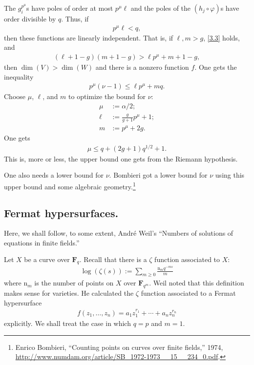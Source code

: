 \documentclass [11 pt, oneside] {article}
\begin{document}
The $g_{i}^{p^{\mu}}$s have poles of order at most $p^{\mu}\ell$ and the poles of the $(h_{j}\circ \varphi)$s have order divisible by $q$. Thus, if
\begin{align}\label{3.3}
	p^{\mu}\ell < q,
\end{align}
then these functions are linearly independent. That is, if $\ell,m >g$, \cref{3.3} holds, and 
\begin{align*}
	 (\ell+1-g) (m+1-g) > \ell p^{\mu} + m+1-g,
\end{align*}
then $\dim(V) > \dim (W)$ and there is a nonzero function $f$. 
One gets the inequality
\begin{align*}
	p^{\mu}(\nu -1) \le \ell p^{\mu}+ mq.
\end{align*}
Choose $\mu$, $\ell$, and $m$ to optimize the bound for $\nu$:
\begin{align*}
	\mu &:= \alpha/2;\\
	\ell &:= \frac{g}{g+1}p^{\mu} + 1;\\
	m &:= p^{\mu}+2g.
\end{align*}
One gets
\begin{align*}
	\mu \le q + (2g+1) q^{1/2} + 1.
\end{align*}
This is, more or less, the upper bound one gets from the Riemann hypothesis.

One also needs a lower bound for $\nu$. Bombieri got a lower bound for $\nu$ using this upper bound and some algebraic geometry.\footnote{Enrico Bombieri, ``Counting points on curves over finite fields,'' 1974, \url{http://www.numdam.org/article/SB_1972-1973__15__234_0.pdf}.}

\subsection{Fermat hypersurfaces.}
Here, we shall follow, to some extent, Andr\'e Weil's ``Numbers of solutions of equations in finite fields.''

Let $X$ be a curve over $\mathbf{F}_{q}$. Recall that there is a $\zeta$ function associated to $X$:
\begin{align*}
	\log(\zeta(s)) := \sum_{m\ge 0}^{}\frac{\mathup{n}_{m}q^{-ms}}{m}
\end{align*}
where $\mathup{n}_{m}$ is the number of points on $X$ over $\mathbf{F}_{q^{m}}$.
Weil noted that this definition makes sense for varieties.
He calculated the $\zeta$ function associated to a Fermat hypersurface
\begin{align*}
	f(z_1,\hdots, z_{n}) = a_1z_1^{r_1} + \cdots + a_{n}z_{n}^{r_{n}}
\end{align*}
explicitly.
We shall treat the case in which $q=p$ and $m=1$.
\end{document}
